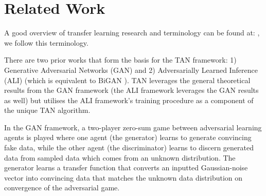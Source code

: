 \documentclass{article}
\begin{document}



\section{Related Work}

A good overview of transfer learning research and terminology can be found at: \cite{pan2010survey}, we follow this terminology.

There are two prior works that form the basis for the TAN framework: 1) Generative Adversarial Networks (GAN) \cite{goodfellow2014generative} and 2) Adversarially Learned Inference (ALI) \cite{dumoulin2016adversarially} (which is equivalent to BiGAN \cite{donahue2016adversarial}). TAN leverages the general theoretical results from the GAN framework (the ALI framework leverages the GAN results as well) but utilises the ALI framework's training procedure as a component of the unique TAN algorithm.

In the GAN framework, a two-player zero-sum game between adversarial learning agents is played where one agent (the generator) learns to generate convincing fake data, while the other agent (the discriminator) learns to discern generated data from sampled data which comes from an unknown distribution. The generator learns a transfer function that converts an inputted Gaussian-noise vector into convincing data that matches the unknown data distribution on convergence of the adversarial game.
\end{document}

